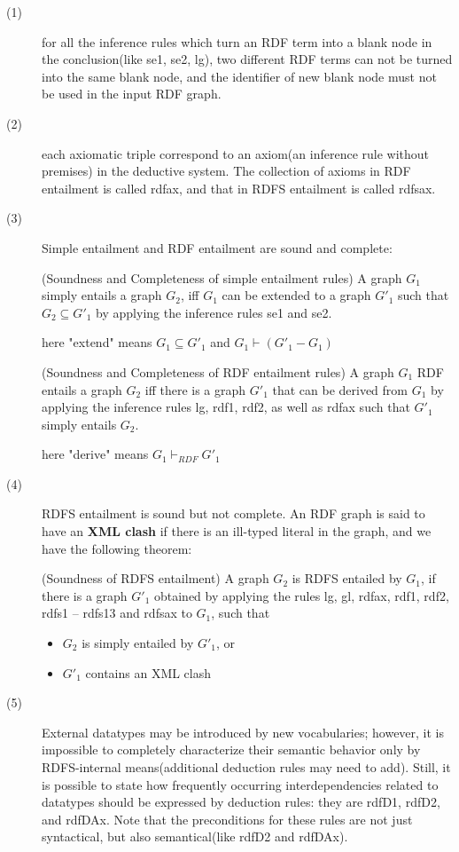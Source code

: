 \documentclass{article}
\begin{document}
\begin{description}
\item[(1)] for all the inference rules which turn an RDF term into a blank node in the conclusion(like se1, se2, lg), two different RDF terms can not be turned into the same blank node, and the identifier of new blank node must not be used in the input RDF graph. 
\item[(2)] each axiomatic triple correspond to an axiom(an inference rule without premises) in the deductive system. The collection of axioms in RDF entailment is called rdfax, and that in RDFS entailment is called rdfsax.
\item[(3)] Simple entailment and RDF entailment are sound and complete:
\begin{theo}(Soundness and Completeness of simple entailment rules)\newline
A graph $G_1$ simply entails a graph $G_2$, iff $G_1$ can be extended to a graph $G'_1$ such that $G_2 \subseteq G'_1$ by applying the inference rules se1 and se2. 
\end{theo}
here "extend" means $G_1 \subseteq G'_1$ and $G_1 \vdash (G'_1 - G_1)$
\begin{theo}(Soundness and Completeness of RDF entailment rules)\newline
A graph $G_1$ RDF entails a graph $G_2$ iff there is a graph $G'_1$ that can be derived from $G_1$ by applying the inference rules lg, rdf1, rdf2, as well as rdfax such that $G'_1$ simply entails $G_2$.
\end{theo}
here "derive" means $G_1 \vdash_{RDF} G'_1$
\item[(4)] RDFS entailment is sound but not complete. An RDF graph is said to have an \textbf{XML clash} if there is an ill-typed literal in the graph, and we have the following theorem:
\begin{theo}(Soundness of RDFS entailment)\newline
A graph $G_2$ is RDFS entailed by $G_1$, if there is a graph $G'_1$ obtained by applying the rules lg, gl, rdfax, rdf1, rdf2, rdfs1 – rdfs13 and rdfsax to $G_1$, such that
\begin{itemize}
\item $G_2$ is simply entailed by $G'_1$, or 
\item $G'_1$ contains an XML clash
\end{itemize}
\end{theo} 
\item[(5)]External datatypes may be introduced by new vocabularies; however, it is impossible to completely characterize their semantic behavior only by RDFS-internal means(additional deduction rules may need to add). Still, it is possible to state how frequently occurring interdependencies related to datatypes should be expressed by deduction rules: they are rdfD1, rdfD2, and rdfDAx. Note that the preconditions for these rules are not just syntactical, but also semantical(like rdfD2 and rdfDAx).
\end{description}
\end{document}
